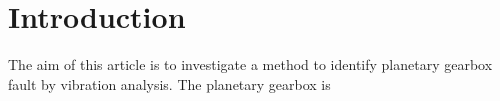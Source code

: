 \chapter{Introduction}\label{ch:introduction}

The aim of this article is to investigate a method to identify planetary gearbox fault by vibration analysis. The planetary gearbox is 


